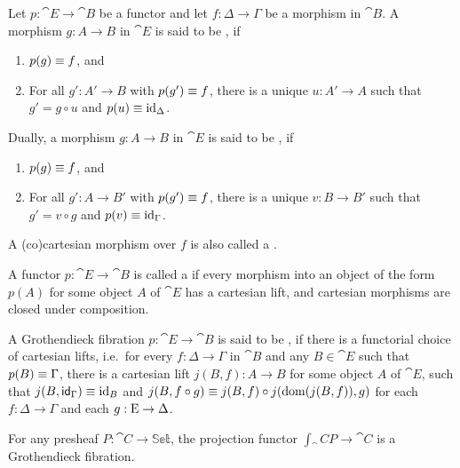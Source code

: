 \begin{defn}
Let $p:\cat{E}\to\cat{B}$ be a functor and let $f:\Delta\to \Gamma$ be a morphism in $\cat{B}$.
A morphism $g:A\to B$ in $\cat{E}$ is said to be , if
\begin{enumerate}
\item $p(g)\jdeq f$, and 
\item For all $g':A'\to B$ with $p(g')\jdeq f$, there is a unique $u:A'\to A$
such that $g'=g\circ u$ and $p(u)\jdeq\catid{\Delta}$. 
\end{enumerate}
Dually, a morphism $g:A\to B$ in $\cat{E}$ is said to be , if
\begin{enumerate}
\item $p(g)\jdeq f$, and
\item For all $g':A\to B'$ with $p(g')\jdeq f$, there is a unique $v:B\to B'$
such that $g'=v\circ g$ and $p(v)\jdeq\catid{\Gamma}$. 
\end{enumerate}
A (co)cartesian morphism over $f$ is also called a .
\end{defn}

\begin{defn}
A functor $p:\cat{E}\to\cat{B}$ is called a  if
every morphism into an object of the form $p(A)$ for some object $A$ of $\cat{E}$ 
has a cartesian lift, and cartesian morphisms are closed under composition.
\end{defn}

\begin{defn}
A Grothendieck fibration $p:\cat{E}\to\cat{B}$ is said to be , if
there is a functorial choice of cartesian lifts, i.e.~for every $f:\Delta\to \Gamma$ in 
$\cat{B}$ and any $B\in \cat{E}$ such that $p(B)\jdeq \Gamma$,
there is a cartesian lift $j(B,f):A \to B$ for some object $A$ of $\cat{E}$, such that 
$j(B,\idfunc[\Gamma])\jdeq\catid{B}$ and 
$j(B, f\circ g)\jdeq j(B,f)\circ j(\mathrm{dom}(j(B,f)),g)$ for each
$f:\Delta\to\Gamma$ and each $g:\greek{E}\to\Delta$. 
\end{defn}

\begin{eg}
For any presheaf $P:\cat{C}\to\mathbb{Set}$, the projection functor
$\int_\cat{C} P\to\cat{C}$ is a Grothendieck fibration.
\end{eg}

